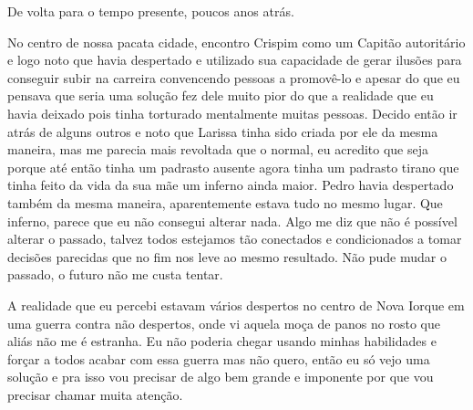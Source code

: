 De volta para o tempo presente, poucos anos atrás.

No centro de nossa pacata cidade, encontro Crispim como um Capitão autoritário e logo noto que havia despertado e utilizado sua capacidade de gerar ilusões para conseguir subir na carreira convencendo pessoas a promovê-lo e apesar do que eu pensava que seria uma solução fez dele muito pior do que a realidade que eu havia deixado pois tinha torturado mentalmente muitas pessoas. Decido então ir atrás de alguns outros e noto que Larissa tinha sido criada por ele da mesma maneira, mas me parecia mais revoltada que o normal, eu acredito que seja porque até então tinha um padrasto ausente agora tinha um padrasto tirano que tinha feito da vida da sua mãe um inferno ainda maior. Pedro havia despertado também da mesma maneira, aparentemente estava tudo no mesmo lugar. Que inferno, parece que eu não consegui alterar nada. Algo me diz que não é possível alterar o passado, talvez todos estejamos tão conectados e condicionados a tomar decisões parecidas que no fim nos leve ao mesmo resultado. Não pude mudar o passado, o futuro não me custa tentar.

A realidade que eu percebi estavam vários despertos no centro de Nova Iorque em uma guerra contra não despertos, onde vi aquela moça de panos no rosto que aliás não me é estranha. Eu não poderia chegar usando minhas habilidades e forçar a todos acabar com essa guerra mas não quero, então eu só vejo uma solução e pra isso vou precisar de algo bem grande e imponente por que vou precisar chamar muita atenção.
